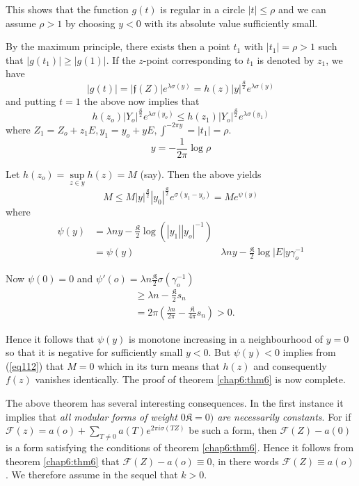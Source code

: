 This shows that the function $g(t)$ is regular in a circle $| t | \leq
\rho $ and we can assume $\rho >1$ by choosing $y < 0$ with its
absolute value sufficiently small. 

By the maximum principle, there exists then a point $t_1$ with $|t_1|=
\rho > 1$ such that $|g(t_1) | \geq | g (1) |$. If the $z$-point
corresponding to $t_1$ is denoted by $z_1$, we have  
$$
| g (t) | = | \mathfrak{f}(Z) | e^{\lambda \sigma (y)} = h (z) | y
|^{\frac{\mathfrak{K}}{2}} e^{\lambda \sigma (y)} 
$$
and putting $t=1$ the above now implies that 
$$
h (z_o) | Y_o |^{\frac{\mathfrak{K}}{2}}e^{\lambda \sigma (y_o)} \leq
h(z_1) |Y_o|^{\frac{\mathfrak{K}}{2}}e^{\lambda \sigma (y_1)} 
$$
where $Z_1 = Z_o + z_1 E , y_1 = y_o + yE, \int^{-2 \pi y} = | t_1| =
\rho$. 
$$
y = - \frac{1}{2 \pi} \log \rho 
$$

Let $h (z_o) = \sup\limits_{z \in y} h(z) = M$ (say). Then the
above yields  
\begin{equation*}
M \leq M | y |^{\frac{\mathfrak{K}}{2}} |y_0 |^{\frac{\mathfrak{K}}{2}}
e^{\sigma (y_1 - y_o)} = M e^{\psi (y)} \tag{112}\label{eq112}  
\end{equation*}
where\pageoriginale 
\begin{align*}
\psi (y) & = \lambda n y - \frac{\mathfrak{K}}{2} \log (| y_1|
|y_o|^{-1}) \\ 
& =\psi (y) & \lambda n y - \frac{\mathfrak{K}}{2} \log |E |y
\gamma_o^{-1} 
\end{align*}

Now $\psi (0) = 0$ and $\psi' (o) = \lambda n \frac{\mathfrak{K}}{2}
\sigma (\gamma^{-1}_o)$ 
\begin{align*}
& \geq \lambda n - \frac{\mathfrak{K}}{2} s_n\\
&= 2 \pi (\frac{\lambda n}{2 \pi } - \frac{\mathfrak{K}}{4 \pi} s_n) > 0.
\end{align*}

Hence it follows that $\psi (y)$ is monotone increasing in a
neighbourhood of $y = 0$ so that it is negative for sufficiently
small $y < 0$. But $\psi (y) < 0$ implies from (\ref{eq112}) that $M = 0$
which in its turn means that $h (z)$ and consequently $f (z)$ vanishes
identically. The proof of theorem \ref{chap6:thm6} is now complete. 

The above theorem has several interesting consequences. In the first
instance it implies that \textit{all modular forms of weight $0
  \mathfrak{K} = 0)$ are necessarily constants}. For if $\mathcal{F}(z)
= a (o) + \sum\limits_{T \neq 0} a (T) e^{2 \pi i \sigma(TZ)}$ be such a
form, then $\mathcal{F}(Z) - a (0)$ is a form satisfying the
conditions of theorem \ref{chap6:thm6}. Hence it follows from theorem
\ref{chap6:thm6} that 
$\mathcal{F}(Z) - a (o) \equiv 0$, in there words $\mathcal{F} (Z) \equiv a
(o)$. We therefore assume in the sequel that $k > 0$. 
 
